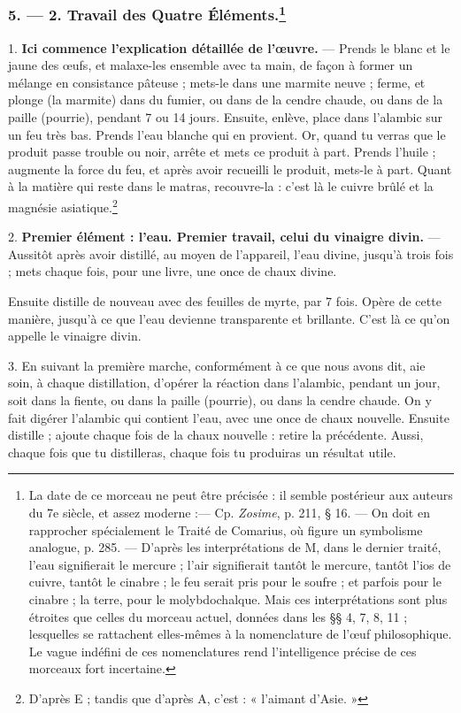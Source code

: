 \documentclass[a4paper, 11pt, oneside, polutonikogreek, french]{article}
\begin{document}
\subsubsection[5. --- 2. Travail des Quatre Éléments.]{5. --- 2. Travail des Quatre Éléments.\footnote{La date de ce morceau ne peut être précisée : il semble postérieur aux auteurs du 7e siècle, et assez moderne :--- Cp. \emph{Zosime}, p. 211, § 16. --- On doit en rapprocher spécialement le Traité de Comarius, où figure un symbolisme analogue, p. 285. --- D'après les interprétations de M, dans le dernier traité, l'eau signifierait le mercure ; l'air signifierait tantôt le mercure, tantôt l'ios de cuivre, tantôt le cinabre ; le feu serait pris pour le soufre ; et parfois pour le cinabre ; la terre, pour le molybdochalque. Mais ces interprétations sont plus étroites que celles du morceau actuel, données dans les §§ 4, 7, 8, 11 ; lesquelles se rattachent elles-mêmes à la nomenclature de l'œuf philosophique. Le vague indéfini de ces nomenclatures rend l'intelligence précise de ces morceaux fort incertaine.}}

1. \textbf{Ici commence l'explication détaillée de l'œuvre.} --- Prends le blanc et le jaune des œufs, et malaxe-les ensemble avec ta main, de façon à former un mélange en consistance pâteuse ; mets-le dans une marmite neuve ; ferme, et plonge (la marmite) dans du fumier, ou dans de la cendre chaude, ou dans de la paille (pourrie), pendant 7 ou 14 jours. Ensuite, enlève, place dans l'alambic sur un feu très bas. Prends l'eau blanche qui en provient. Or, quand tu verras que le produit passe trouble ou noir, arrête et mets ce produit à part. Prends l'huile ; augmente la force du feu, et après avoir recueilli le produit, mets-le à part. Quant à la matière qui reste dans le matras, recouvre-la : c'est là le cuivre brûlé et la magnésie asiatique.\footnote{D'après E ; tandis que d'après A, c'est : « l'aimant d'Asie. »}

2. \textbf{Premier élément : l'eau. Premier travail, celui du vinaigre divin.} --- Aussitôt après avoir distillé, au moyen de l'appareil, l'eau divine, jusqu'à trois fois ; mets chaque fois, pour une livre, une once de chaux divine.

Ensuite distille de nouveau avec des feuilles de myrte, par 7 fois. Opère de cette manière, jusqu'à ce que l'eau devienne transparente et brillante. C'est là ce qu'on appelle le vinaigre divin.

3. En suivant la première marche, conformément à ce que nous avons dit, aie soin, à chaque distillation, d'opérer la réaction dans l'alambic, pendant un jour, soit dans la fiente, ou dans la paille (pourrie), ou dans la cendre chaude. On y fait digérer l'alambic qui contient l'eau, avec une once de chaux nouvelle. Ensuite distille ; ajoute chaque fois de la chaux nouvelle : retire la précédente. Aussi, chaque fois que tu distilleras, chaque fois tu produiras un résultat utile.
\end{document}
